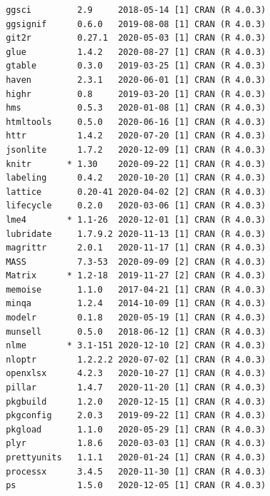 \documentclass[twoside,12pt,final]{ucthesis-CA2012}
\begin{document}
\begin{ucmainmatter}
\begin{verbatim}
 ggsci         2.9     2018-05-14 [1] CRAN (R 4.0.3)                       
 ggsignif      0.6.0   2019-08-08 [1] CRAN (R 4.0.3)                       
 git2r         0.27.1  2020-05-03 [1] CRAN (R 4.0.3)                       
 glue          1.4.2   2020-08-27 [1] CRAN (R 4.0.3)                       
 gtable        0.3.0   2019-03-25 [1] CRAN (R 4.0.3)                       
 haven         2.3.1   2020-06-01 [1] CRAN (R 4.0.3)                       
 highr         0.8     2019-03-20 [1] CRAN (R 4.0.3)                       
 hms           0.5.3   2020-01-08 [1] CRAN (R 4.0.3)                       
 htmltools     0.5.0   2020-06-16 [1] CRAN (R 4.0.3)                       
 httr          1.4.2   2020-07-20 [1] CRAN (R 4.0.3)                       
 jsonlite      1.7.2   2020-12-09 [1] CRAN (R 4.0.3)                       
 knitr       * 1.30    2020-09-22 [1] CRAN (R 4.0.3)                       
 labeling      0.4.2   2020-10-20 [1] CRAN (R 4.0.3)                       
 lattice       0.20-41 2020-04-02 [2] CRAN (R 4.0.3)                       
 lifecycle     0.2.0   2020-03-06 [1] CRAN (R 4.0.3)                       
 lme4        * 1.1-26  2020-12-01 [1] CRAN (R 4.0.3)                       
 lubridate     1.7.9.2 2020-11-13 [1] CRAN (R 4.0.3)                       
 magrittr      2.0.1   2020-11-17 [1] CRAN (R 4.0.3)                       
 MASS          7.3-53  2020-09-09 [2] CRAN (R 4.0.3)                       
 Matrix      * 1.2-18  2019-11-27 [2] CRAN (R 4.0.3)                       
 memoise       1.1.0   2017-04-21 [1] CRAN (R 4.0.3)                       
 minqa         1.2.4   2014-10-09 [1] CRAN (R 4.0.3)                       
 modelr        0.1.8   2020-05-19 [1] CRAN (R 4.0.3)                       
 munsell       0.5.0   2018-06-12 [1] CRAN (R 4.0.3)                       
 nlme        * 3.1-151 2020-12-10 [2] CRAN (R 4.0.3)                       
 nloptr        1.2.2.2 2020-07-02 [1] CRAN (R 4.0.3)                       
 openxlsx      4.2.3   2020-10-27 [1] CRAN (R 4.0.3)                       
 pillar        1.4.7   2020-11-20 [1] CRAN (R 4.0.3)                       
 pkgbuild      1.2.0   2020-12-15 [1] CRAN (R 4.0.3)                       
 pkgconfig     2.0.3   2019-09-22 [1] CRAN (R 4.0.3)                       
 pkgload       1.1.0   2020-05-29 [1] CRAN (R 4.0.3)                       
 plyr          1.8.6   2020-03-03 [1] CRAN (R 4.0.3)                       
 prettyunits   1.1.1   2020-01-24 [1] CRAN (R 4.0.3)                       
 processx      3.4.5   2020-11-30 [1] CRAN (R 4.0.3)                       
 ps            1.5.0   2020-12-05 [1] CRAN (R 4.0.3)                       

\end{verbatim}
\end{ucmainmatter}
\end{document}
